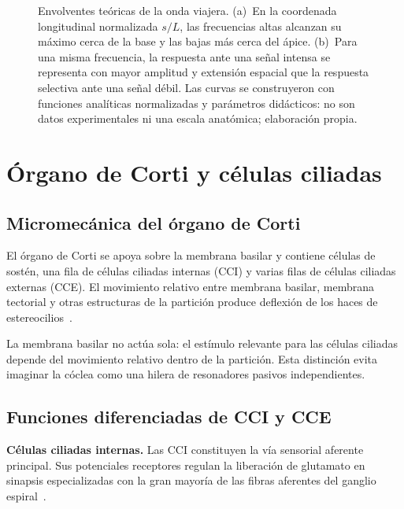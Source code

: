 \begin{figure}[htbp]
    \centering
    
    \caption{Envolventes teóricas de la onda viajera. (a)~En la coordenada
    longitudinal normalizada \(s/L\), las frecuencias altas alcanzan su máximo
    cerca de la base y las bajas más cerca del ápice. (b)~Para una misma
    frecuencia, la respuesta ante una señal intensa se representa con mayor
    amplitud y extensión espacial que la respuesta selectiva ante una señal
    débil. Las curvas se construyeron con funciones analíticas normalizadas y
    parámetros didácticos: no son datos experimentales ni una escala
    anatómica; elaboración propia.}
    \label{fig:u6-onda-viajera-tonotopia}
\end{figure}

\section{Órgano de Corti y células ciliadas}
\label{sec:u6-organo-corti}

\subsection{Micromecánica del órgano de Corti}
\label{sec:u6-micromecanica}

El órgano de Corti se apoya sobre la membrana basilar y contiene
células de sostén, una fila de células ciliadas internas (CCI) y varias filas
de células ciliadas externas (CCE). El movimiento relativo entre membrana
basilar, membrana tectorial y otras estructuras de la partición produce
deflexión de los haces de estereocilios~\cite{fettiplace2017,capraraPeng2022}.

La membrana basilar no actúa sola: el estímulo relevante para las células
ciliadas depende del movimiento relativo dentro de la partición. Esta
distinción evita imaginar la cóclea como una hilera de resonadores pasivos
independientes.

\subsection{Funciones diferenciadas de CCI y CCE}
\label{sec:u6-cci-cce}

\textbf{Células ciliadas internas.} Las CCI constituyen la vía
sensorial aferente principal. Sus potenciales receptores regulan la liberación
de glutamato en sinapsis especializadas con la gran mayoría de las fibras
aferentes del ganglio espiral~\cite{fettiplace2017,capraraPeng2022}.

